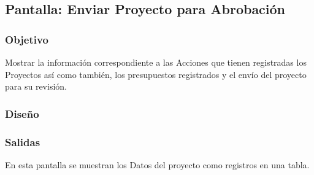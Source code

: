 \subsection{Pantalla: Enviar Proyecto para Abrobación}
\subsubsection{Objetivo}
  Mostrar la información correspondiente a las Acciones que tienen registradas los Proyectos así como también, los presupuestos registrados y el envío del proyecto 
  para su revisión.

\subsubsection{Diseño}

\subsubsection{Salidas}
  En esta pantalla se muestran los Datos del proyecto como registros en una tabla.



